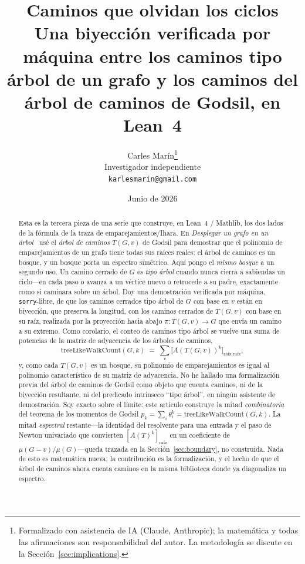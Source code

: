 \documentclass[11pt]{article}
\title{\bf Caminos que olvidan los ciclos\\[4pt]
  \large\normalfont Una biyecci\'on verificada por m\'aquina entre los caminos tipo \'arbol de un grafo
  y los caminos del \'arbol de caminos de Godsil, en Lean~4}
\author{Carles Mar\'in\thanks{Formalizado con asistencia de IA (Claude, Anthropic); la matem\'atica y
todas las afirmaciones son responsabilidad del autor. La metodolog\'ia se discute en la
Secci\'on~\ref{sec:implications}.}\\[3pt]
  \normalsize Investigador independiente\\
  \normalsize \texttt{karlesmarin@gmail.com}}
\date{Junio de 2026}
\newcommand{\lean}[1]{\texttt{#1}}
\begin{document}
\maketitle

\begin{abstract}
Esta es la tercera pieza de una serie que construye, en Lean~4 / Mathlib, los dos lados de la
f\'ormula de la traza de emparejamientos/Ihara. En \emph{Desplegar un grafo en un \'arbol}~\cite{PartII}
us\'e el \emph{\'arbol de caminos} $T(G,v)$ de Godsil para demostrar que el polinomio de
emparejamientos de un grafo tiene todas sus ra\'ices reales: el \'arbol de caminos es un bosque, y un
bosque porta un espectro sim\'etrico. Aqu\'i pongo el \emph{mismo bosque} a un segundo uso. Un camino
cerrado de $G$ es \emph{tipo \'arbol} cuando nunca cierra a sabiendas un ciclo---en cada paso o avanza
a un v\'ertice nuevo o retrocede a su padre, exactamente como si caminara sobre un \'arbol. Doy una
demostraci\'on verificada por m\'aquina, \lean{sorry}-libre, de que los caminos cerrados tipo \'arbol
de $G$ con base en $v$ est\'an en biyecci\'on, que preserva la longitud, con los caminos cerrados de
$T(G,v)$ con base en su ra\'iz, realizada por la proyecci\'on hacia abajo $\pi\colon T(G,v)\to G$ que
env\'ia un camino a su extremo. Como corolario, el conteo de caminos tipo \'arbol se vuelve una suma
de potencias de la matriz de adyacencia de los \'arboles de caminos,
\[
  \mathrm{treeLikeWalkCount}(G,k)\;=\;\sum_{v}\bigl[A(T(G,v))^{k}\bigr]_{\text{ra\'iz},\text{ra\'iz}},
\]
y, como cada $T(G,v)$ es un bosque, su polinomio de emparejamientos es igual al polinomio
caracter\'istico de su matriz de adyacencia. No he hallado una formalizaci\'on previa del \'arbol de
caminos de Godsil como objeto que cuenta caminos, ni de la biyecci\'on resultante, ni del predicado
intr\'inseco ``tipo \'arbol'', en ning\'un asistente de demostraci\'on. Soy exacto sobre el l\'imite:
este art\'iculo construye la mitad \emph{combinatoria} del teorema de los momentos de Godsil
$p_k=\sum_i\theta_i^{k}=\mathrm{treeLikeWalkCount}(G,k)$. La mitad \emph{espectral} restante---la
identidad del resolvente para una entrada y el paso de Newton univariado que convierten
$[A(T)^k]_{\text{ra\'iz}}$ en un coeficiente de $\mu(G-v)/\mu(G)$---queda trazada en la
Secci\'on~\ref{sec:boundary}, no construida. Nada de esto es matem\'atica nueva; la contribuci\'on es
la formalizaci\'on, y el hecho de que el \'arbol de caminos ahora cuenta caminos en la misma
biblioteca donde ya diagonaliza un espectro.
\end{abstract}
\end{document}
